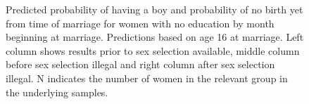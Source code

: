 \documentclass[12pt,letterpaper]{article}
\begin{document}
\begin{figure}[htpb!]
{\begin{minipage}{0.28\textwidth}
\captionsetup[subfigure]{labelformat=parens}
\end{minipage}
}
\setcounter{subfigure}{3}
\caption{Predicted probability of having a boy and probability of
no birth yet from time of marriage for women with no education by month beginning at marriage. 
Predictions based on age 16 at marriage.
Left column shows results prior to sex selection available, middle column before
sex selection illegal and right column after sex selection illegal.
N indicates the number of women in the relevant group in the underlying samples.
}
\label{fig:results_spell1_low}
\end{figure}
\end{document}
